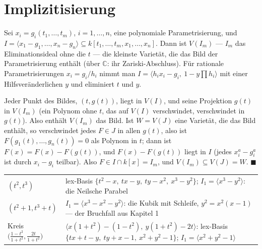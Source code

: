\section{Implizitisierung}

\begin{merksatz}
Sei $x_i = g_i(t_1, \ldots, t_m)$, $i = 1, \ldots, n$, eine polynomiale Parametrisierung, und $I = \langle x_1 - g_1, \ldots, x_n - g_n\rangle\subseteq k[t_1, \ldots, t_m, x_1, \ldots, x_n]$. Dann ist $V(I_m)$ --- $I_m$ das Eliminationsideal ohne die $t$ --- die kleinste Varietät, die das Bild der Parametrisierung enthält (über $\mathbb C$: ihr Zariski-Abschluss). Für rationale Parametrisierungen $x_i = g_i/h_i$ nimmt man $I = \langle h_ix_i - g_i,\ 1 - y\prod h_i\rangle$ mit einer Hilfsveränderlichen $y$ und eliminiert $t$ und $y$.

Jeder Punkt des Bildes, $(t, g(t))$, liegt in $V(I)$, und seine Projektion $g(t)$ in $V(I_m)$ (ein Polynom ohne $t$, das auf $V(I)$ verschwindet, verschwindet in $g(t)$). Also enthält $V(I_m)$ das Bild. Ist $W = V(J)$ eine Varietät, die das Bild enthält, so verschwindet jedes $F\in J$ in allen $g(t)$, also ist $F(g_1(t), \ldots, g_n(t)) = 0$ als Polynom in $t$; dann ist $F(x) = F(x) - F(g(t))$, und $F(x) - F(g(t))$ liegt in $I$ (jedes $x_i^{a} - g_i^{a}$ ist durch $x_i - g_i$ teilbar). Also $F\in I\cap k[x] = I_m$, und $V(I_m)\subseteq V(J) = W$. $\blacksquare$

\begin{center}
{\small
\renewcommand{\arraystretch}{1.5}
\begin{tabular}{@{}P{3.4cm}P{5.2cm}@{}}
\toprule
$(t^{2}, t^{3})$ & lex-Basis $\{t^{2} - x,\ tx - y,\ ty - x^{2},\ x^{3} - y^{2}\}$; $I_1 = \langle x^{3} - y^{2}\rangle$: die Neilsche Parabel\\
$(t^{2} + 1, t^{3} + t)$ & $I_1 = \langle x^{3} - x^{2} - y^{2}\rangle$: die Kubik mit Schleife, $y^{2} = x^{2}(x - 1)$ --- der Bruchfall aus Kapitel 1\\
Kreis $\bigl(\frac{1-t^{2}}{1+t^{2}}, \frac{2t}{1+t^{2}}\bigr)$ & $\langle x(1+t^{2}) - (1 - t^{2}),\ y(1+t^{2}) - 2t\rangle$: lex-Basis $\{tx + t - y,\ ty + x - 1,\ x^{2} + y^{2} - 1\}$; $I_1 = \langle x^{2} + y^{2} - 1\rangle$\\
\bottomrule
\end{tabular}}
\end{center}


\end{merksatz}
